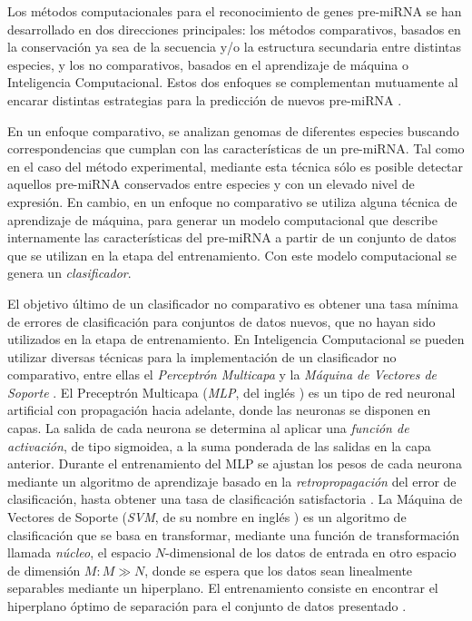 \documentclass[12pt,bibliography=oldstyle,DIV=14,parskip=full-,titlepage]{scrartcl}
\begin{document}
Los métodos computacionales para el reconocimiento de genes pre-miRNA se
han desarrollado en dos direcciones principales: los métodos
comparativos, basados en la conservación ya sea de la secuencia y/o la
estructura secundaria entre distintas especies, y los no comparativos,
basados en el aprendizaje de máquina o Inteligencia
Computacional. Estos dos enfoques se complementan mutuamente al
encarar distintas estrategias para la predicción de nuevos pre-miRNA
\cite{batuwita}\cite{sheng}.

En un enfoque comparativo, se analizan genomas de diferentes especies
buscando correspondencias que cumplan con las características de un
pre-miRNA. Tal como en el caso del método experimental, mediante esta
técnica sólo es posible detectar aquellos pre-miRNA conservados entre
especies y con un elevado nivel de expresión. En cambio, en un enfoque
no comparativo se utiliza alguna técnica de aprendizaje de máquina,
para generar un modelo computacional que describe internamente las
características del pre-miRNA a partir de un conjunto de datos que se
utilizan en la etapa del entrenamiento. Con este modelo computacional
se genera un \emph{clasificador}.

El objetivo último de un clasificador no comparativo es obtener una
tasa mínima de errores de clasificación para conjuntos de datos
nuevos, que no hayan sido utilizados en la etapa de entrenamiento.  En
Inteligencia Computacional se pueden utilizar diversas técnicas para
la implementación de un clasificador no comparativo, entre ellas
el \emph{Perceptrón Multicapa}
\cite{mlp1}\cite{mlp2} y la \emph{Máquina de Vectores de Soporte}
\cite{svm}.  El Preceptrón Multicapa (\emph{MLP}, del inglés
) es un tipo de red neuronal artificial con
propagación hacia adelante, donde las neuronas se disponen en capas.
La salida de cada neurona se determina al aplicar una \emph{función de
  activación}, de tipo sigmoidea, a la suma ponderada de las salidas
en la capa anterior. Durante el entrenamiento del MLP se ajustan los
pesos de cada neurona mediante un algoritmo de aprendizaje basado en
la \emph{retropropagación} del error de clasificación, hasta obtener
una tasa de clasificación satisfactoria \cite{jain}.  La Máquina de
Vectores de Soporte (\emph{SVM}, de su nombre en inglés ) es un algoritmo de clasificación que se basa en
transformar, mediante una función de transformación llamada \emph{núcleo}, el
espacio $N$-dimensional de los datos de entrada en otro espacio de
dimensión $M: M\gg N$, donde se espera que los datos sean linealmente
separables mediante un hiperplano. El entrenamiento consiste en
encontrar el hiperplano óptimo de separación para el conjunto de datos
presentado \cite{bottou}.
\end{document}
